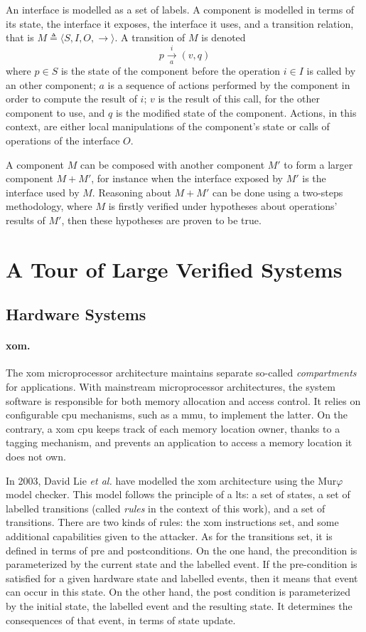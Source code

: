 An interface is modelled as a set of labels.
%
A component is modelled in terms of its state, the interface it exposes, the
interface it uses, and a transition relation, that is
$M \triangleq \langle S, I, O, \rightarrow \rangle$.
%
A transition of $M$ is denoted
%
\[ p \xrightarrow[a]{i} (v, q) \]
%
where $p \in S$ is the state of the component before the operation $i \in I$ is
called by an other component;
%
$a$ is a sequence of actions performed by the component in order to compute the
result of $i$;
%
$v$ is the result of this call, for the other component to use, and $q$ is the
modified state of the component.
%
Actions, in this context, are either local manipulations of the component's
state or calls of operations of the interface $O$.

A component $M$ can be composed with another component $M'$ to form a larger
component $M + M'$, for instance when the interface exposed by $M'$ is the
interface used by $M$.
%
Reasoning about $M + M'$ can be done using a two-steps methodology, where $M$ is
firstly verified under hypotheses about operations' results of $M'$, then these
hypotheses are proven to be true.

\section{A Tour of Large Verified Systems}

\subsection{Hardware Systems}

\paragraph{\ac{xom}.}
%
The \ac{xom} microprocessor architecture maintains separate so-called
\emph{compartments} for applications.
%
With mainstream microprocessor architectures, the system software is responsible
for both memory allocation and access control.
%
It relies on configurable \ac{cpu} mechanisms, such as a \ac{mmu}, to implement
the latter.
%
On the contrary, a \ac{xom} \ac{cpu} keeps track of each memory location owner,
thanks to a tagging mechanism, and prevents an application to access a memory
location it does not own.

In 2003, David Lie \emph{et al.} have modelled the \ac{xom} architecture using
the Mur$\varphi$ model checker.
%
This model follows the principle of a \ac{lts}: a set of states, a set of
labelled transitions (called \emph{rules} in the context of this work), and a
set of transitions.
%
There are two kinds of rules: the \ac{xom} instructions set, and some additional
capabilities given to the attacker.
%
As for the transitions set, it is defined in terms of pre and postconditions.
%
On the one hand, the precondition is parameterized by the current state and the
labelled event.
%
If the pre-condition is satisfied for a given hardware state and labelled
events, then it means that event can occur in this state.
%
On the other hand, the post condition is parameterized by the initial state, the
labelled event and the resulting state.
%
It determines the consequences of that event, in terms of state update.

